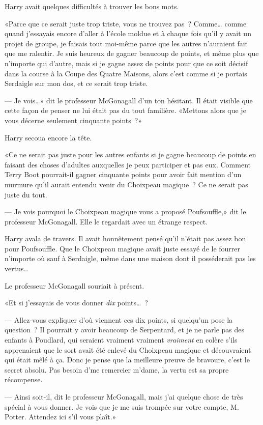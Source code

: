 Harry avait quelques difficultés à trouver les bons mots.

«Parce que ce serait juste trop triste, vous ne trouvez pas~? Comme… comme quand j'essayais encore d'aller à l'école moldue et à chaque fois qu'il y avait un projet de groupe, je faisais tout moi-même parce que les autres n'auraient fait que me ralentir. Je suis heureux de gagner beaucoup de points, et même plus que n'importe qui d'autre, mais si je gagne assez de points pour que ce soit décisif dans la course à la Coupe des Quatre Maisons, alors c'est comme si je portais Serdaigle sur mon dos, et ce serait trop triste.

--- Je vois…» dit le professeur McGonagall d'un ton hésitant. Il était visible que cette façon de penser ne lui était pas du tout familière. «Mettons alors que je vous décerne seulement cinquante points~?»

Harry secoua encore la tête.

«Ce ne serait pas juste pour les autres enfants si je gagne beaucoup de points en faisant des choses d'adultes auxquelles je peux participer et pas eux. Comment Terry Boot pourrait-il gagner cinquante points pour avoir fait mention d'un murmure qu'il aurait entendu venir du Choixpeau magique~? Ce ne serait pas juste du tout.

--- Je vois pourquoi le Choixpeau magique vous a proposé Poufsouffle,» dit le professeur McGonagall. Elle le regardait avec un étrange respect.

Harry avala de travers. Il avait honnêtement pensé qu'il n'était pas assez bon pour Poufsouffle. Que le Choixpeau magique avait juste essayé de le fourrer n'importe où sauf à Serdaigle, même dans une maison dont il posséderait pas les vertus…

Le professeur McGonagall souriait à présent.

«Et si j'essayais de vous donner \emph{dix} points…~?

--- Allez-vous expliquer d'où viennent ces dix points, si quelqu'un pose la question~? Il pourrait y avoir beaucoup de Serpentard, et je ne parle pas des enfants à Poudlard, qui seraient vraiment vraiment \emph{vraiment} en colère s'ils apprenaient que le sort avait été enlevé du Choixpeau magique et découvraient qui était mêlé à ça. Donc je pense que la meilleure preuve de bravoure, c'est le secret absolu. Pas besoin d'me remercier m'dame, la vertu est sa propre récompense.

--- Ainsi soit-il, dit le professeur McGonagall, mais j'ai quelque chose de très spécial à vous donner. Je vois que je me suis trompée sur votre compte, M. Potter. Attendez ici s'il vous plaît.»

